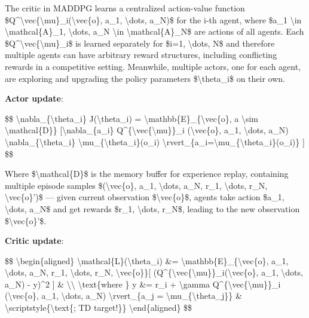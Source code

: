 The critic in MADDPG learns a centralized action-value function \$Q\^{}\textbackslash vec\{\textbackslash mu\}\_i(\textbackslash vec\{o\}, a\_1, \textbackslash dots, a\_N)\$ for the i-th agent, where \$a\_1 \textbackslash in \textbackslash mathcal\{A\}\_1, \textbackslash dots, a\_N \textbackslash in \textbackslash mathcal\{A\}\_N\$ are actions of all agents. Each \$Q\^{}\textbackslash vec\{\textbackslash mu\}\_i\$ is learned separately for \$i=1, \textbackslash dots, N\$ and therefore multiple agents can have arbitrary reward structures, including conflicting rewards in a competitive setting. Meanwhile, multiple actors, one for each agent, are exploring and upgrading the policy parameters \$\textbackslash theta\_i\$ on their own.

\textbf{Actor update}:

\$\$ \textbackslash nabla\_\{\textbackslash theta\_i\} J(\textbackslash theta\_i) = \textbackslash mathbb\{E\}\_\{\textbackslash vec\{o\}, a \textbackslash sim \textbackslash mathcal\{D\}\} {[}\textbackslash nabla\_\{a\_i\} Q\^{}\{\textbackslash vec\{\textbackslash mu\}\}\_i (\textbackslash vec\{o\}, a\_1, \textbackslash dots, a\_N) \textbackslash nabla\_\{\textbackslash theta\_i\} \textbackslash mu\_\{\textbackslash theta\_i\}(o\_i) \textbackslash rvert\_\{a\_i=\textbackslash mu\_\{\textbackslash theta\_i\}(o\_i)\} {]} \$\$

Where \$\textbackslash mathcal\{D\}\$ is the memory buffer for experience replay, containing multiple episode samples \$(\textbackslash vec\{o\}, a\_1, \textbackslash dots, a\_N, r\_1, \textbackslash dots, r\_N, \textbackslash vec\{o\}')\$ --- given current observation \$\textbackslash vec\{o\}\$, agents take action \$a\_1, \textbackslash dots, a\_N\$ and get rewards \$r\_1, \textbackslash dots, r\_N\$, leading to the new observation \$\textbackslash vec\{o\}'\$.

\textbf{Critic update}:

\$\$ \textbackslash begin\{aligned\} \textbackslash mathcal\{L\}(\textbackslash theta\_i) \&= \textbackslash mathbb\{E\}\_\{\textbackslash vec\{o\}, a\_1, \textbackslash dots, a\_N, r\_1, \textbackslash dots, r\_N, \textbackslash vec\{o\}\textquotesingle\}{[} (Q\^{}\{\textbackslash vec\{\textbackslash mu\}\}\_i(\textbackslash vec\{o\}, a\_1, \textbackslash dots, a\_N) - y)\^{}2 {]} \& \textbackslash\textbackslash{} \textbackslash text\{where \} y \&= r\_i + \textbackslash gamma Q\^{}\{\textbackslash vec\{\textbackslash mu\}\textquotesingle\}\_i (\textbackslash vec\{o\}\textquotesingle, a\textquotesingle\_1, \textbackslash dots, a\textquotesingle\_N) \textbackslash rvert\_\{a\textquotesingle\_j = \textbackslash mu\textquotesingle\_\{\textbackslash theta\_j\}\} \& \textbackslash scriptstyle\{\textbackslash text\{; TD target!\}\} \textbackslash end\{aligned\} \$\$

